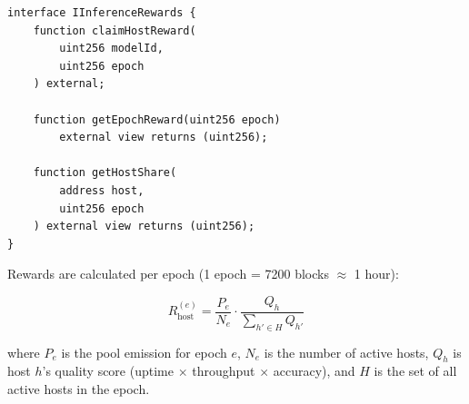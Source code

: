 \begin{lstlisting}[language=Solidity,caption=InferenceRewards distribution]
interface IInferenceRewards {
    function claimHostReward(
        uint256 modelId,
        uint256 epoch
    ) external;

    function getEpochReward(uint256 epoch)
        external view returns (uint256);

    function getHostShare(
        address host,
        uint256 epoch
    ) external view returns (uint256);
}
\end{lstlisting}

Rewards are calculated per epoch (1 epoch = 7200 blocks $\approx$ 1 hour):

\begin{equation}
R_{\text{host}}^{(e)} = \frac{P_e}{N_e} \cdot \frac{Q_h}{\sum_{h' \in H} Q_{h'}}
\end{equation}

where $P_e$ is the pool emission for epoch $e$, $N_e$ is the number of active hosts, $Q_h$ is host $h$'s quality score (uptime $\times$ throughput $\times$ accuracy), and $H$ is the set of all active hosts in the epoch.


